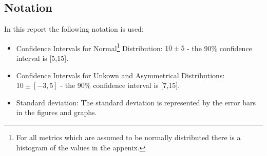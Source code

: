 \documentclass{article}
\begin{document}
    \maketitle
    \tableofcontents
	\subsection{Notation}
		In this report the following notation is used:
		\begin{itemize}
		\item Confidence Intervals for Normal\footnote{For all metrics which are assumed to be normally distributed there is a histogram of the values in the appenix.} Distribution: $10 \pm 5$ - the 90\% confidence interval is [5,15].
		\item Confidence Intervals for Unkown and Asymmetrical Distributions: $10 \pm [-3,5]$ - the 90\% confidence interval is [7,15].
		\item Standard deviation: The standard deviation is represented by the error bars in the figures and graphs.
		\end{itemize}
\end{document}
